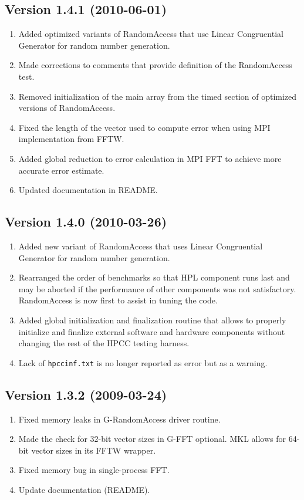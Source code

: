 \documentclass[twocolumn]{article}
\begin{document}
\subsection{Version 1.4.1 (2010-06-01)}
\begin{enumerate}
\item Added optimized variants of RandomAccess that use Linear Congruential Generator for random number generation.
\item Made corrections to comments that provide definition of the RandomAccess test.
\item Removed initialization of the main array from the timed section of optimized versions of RandomAccess.
\item Fixed the length of the vector used to compute error when using MPI implementation from FFTW.
\item Added global reduction to error calculation in MPI FFT to achieve more accurate error estimate.
\item Updated documentation in README.
\end{enumerate}

\subsection{Version 1.4.0 (2010-03-26)}
\begin{enumerate}
\item Added new variant of RandomAccess that uses Linear Congruential Generator for random number generation.
\item Rearranged the order of benchmarks so that HPL component runs last and may be aborted
if the performance of other components was not satisfactory. RandomAccess is now first to assist in tuning
the code.
\item Added global initialization and finalization routine that allows to properly initialize
and finalize external software and hardware components without changing the rest of the HPCC testing harness.
\item Lack of \texttt{hpccinf.txt} is no longer reported as error but as a warning.
\end{enumerate}

\subsection{Version 1.3.2 (2009-03-24)}
\begin{enumerate}
\item Fixed memory leaks in G-RandomAccess driver routine.
\item Made the check for 32-bit vector sizes in G-FFT optional. MKL allows for 64-bit vector sizes in its FFTW wrapper.
\item Fixed memory bug in single-process FFT.
\item Update documentation (README).
\end{enumerate}
\end{document}
